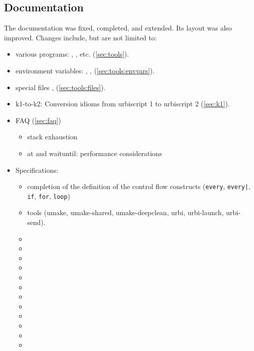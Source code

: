 \subsection{Documentation}

The documentation was fixed, completed, and extended.  Its layout was
also improved.  Changes include, but are not limited to:

\begin{itemize}
\item various programs: , ,
   etc. (\autoref{sec:tools}).
\item environment variables: , ,
   (\autoref{sec:tools:envvars}).
\item special files , 
  (\autoref{sec:tools:files}).
\item k1-to-k2: Conversion idioms from urbiscript 1 to urbiscript 2
  (\autoref{sec:k1}).
\item FAQ (\autoref{sec:faq})
  \begin{itemize}
  \item stack exhaustion
  \item at and waituntil: performance considerations
  \end{itemize}
\item Specifications:
  \begin{itemize}
  \item completion of the definition of the control flow constructs
    (\lstinline|every|, \lstinline{every|}, \lstinline|if|,
    \lstinline|for|, \lstinline|loop|)
  \item tools (umake, umake-shared, umake-deepclean, urbi,
    urbi-launch, urbi-send).
  \item {}
  \item {}
  \item {}
  \item {}
  \item {}
  \item {}
  \item {}
  \item {}
  \item {}
  \item {}
  \item {}
  \item {}

\end{itemize}
\end{itemize}
